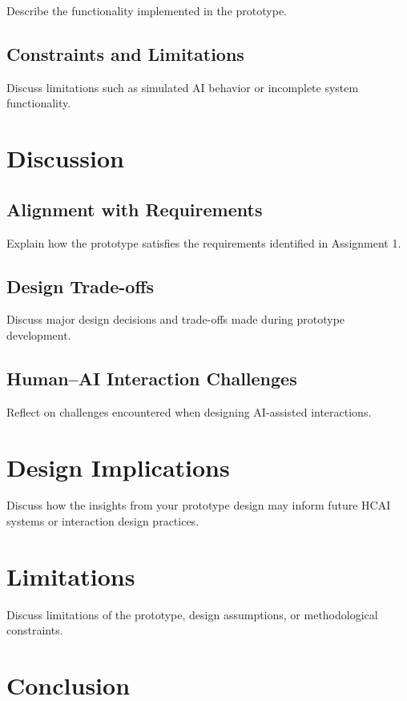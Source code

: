 \documentclass[sigconf]{acmart}
\begin{document}
Describe the functionality implemented in the prototype.

\subsection{Constraints and Limitations}

Discuss limitations such as simulated AI behavior or incomplete system functionality.

\section{Discussion}

\subsection{Alignment with Requirements}

Explain how the prototype satisfies the requirements identified in Assignment 1.

\subsection{Design Trade-offs}

Discuss major design decisions and trade-offs made during prototype development.

\subsection{Human--AI Interaction Challenges}

Reflect on challenges encountered when designing AI-assisted interactions.
\section{Design Implications}
Discuss how the insights from your prototype design may inform future HCAI systems or interaction design practices.

\section{Limitations}
Discuss limitations of the prototype, design assumptions, or methodological constraints.

\section{Conclusion}
\end{document}
